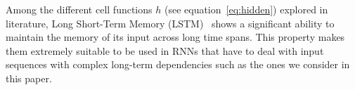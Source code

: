 
Among the different cell functions $h$ (see equation~\eqref{eq:hidden}) explored in literature, Long Short-Term
Memory (LSTM)~\cite{hochreiter1997long} shows a significant ability to maintain the memory of its input across long time spans. This property makes them extremely suitable to be used in RNNs that have to deal with input sequences with complex long-term dependencies such as the ones we consider in this paper.

